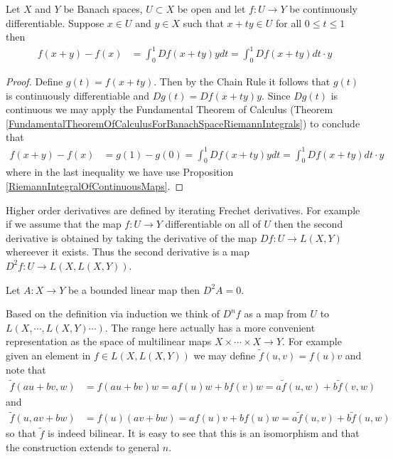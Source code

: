 \begin{thm}\label{MeanValueTheoremBanachSpaces}Let
  $X$ and $Y$ be  Banach spaces, $U \subset X$ be open and let $f : U
  \to Y$ be continuously differentiable.  Suppose $x \in U$ and $y \in
  X$ such that $x + ty \in U$ for all $0 \leq t \leq 1$ then
\begin{align*}
f(x + y) - f(x) &= \int_0^1 Df(x + ty) y dt = \int_0^1 Df(x + ty) dt
                  \cdot y
\end{align*}
\end{thm}
\begin{proof}
Define $g(t) = f(x + ty)$.  Then by the Chain Rule it follows that
$g(t)$ is continuously differentiable and $Dg(t) = Df(x + ty) y$.
Since $Dg(t)$ is continuous we may apply the Fundamental Theorem of
Calculus (Theorem
\ref{FundamentalTheoremOfCalculusForBanachSpaceRiemannIntegrals}) to
conclude that 
\begin{align*}
f(x+y) - f(x) &= g(1) - g(0) = \int_0^1 Df(x+ty) y dt = \int_0^1
                Df(x+ty) dt \cdot y
\end{align*}
where in the last inequality we have use Proposition \ref{RiemannIntegralOfContinuousMaps}.
\end{proof}

Higher order derivatives are defined by iterating Frechet derivatives.  For
example if we assume that the map $f : U \to Y$ differentiable on all
of $U$ then the second derivative is obtained by
taking the derivative of the map $Df : U \to L(X,Y)$ whereever it
exists.  Thus the second derivative is a map $D^2f : U \to
L(X,L(X,Y))$.  

\begin{examp}Let $A : X \to Y$ be a bounded linear map then $D^2A = 0$.
\end{examp}

Based on the definition via induction we think of $D^nf$ as a map from
$U$ to $L(X, \dotsb ,L(X, Y) \dotsb)$.  The range here actually has a
more convenient representation as the space of multilinear maps $X
\times \dotsm \times X \to Y$.  For example given an element in $f \in
L(X,L(X,Y))$ we may define $\tilde{f}(u,v) = f(u) v$ and note that
\begin{align*}
\tilde{f}(au + bv, w) &= f(au + bv) w = a f(u) w + b f(v) w = a
\tilde{f}(u,w) + b \tilde{f}(v,w)
\end{align*} and 
\begin{align*}
\tilde{f}(u, av + bw) &= f(u)(av+bw) = a f(u) v + b f(u) w = a
                        \tilde{f}(u,v) + b\tilde{f}(u,w)
\end{align*}
so that $\tilde{f}$ is indeed bilinear.  It is easy to see that this
is an isomorphism and that the construction extends to general $n$.

